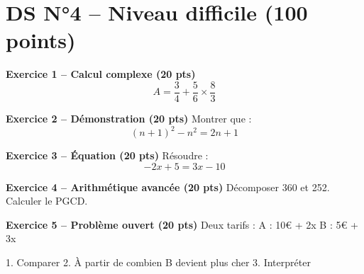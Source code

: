 \documentclass[11pt,a4paper]{article}
\begin{document}
\newpage
\section*{DS N°4 – Niveau difficile (100 points)}

\textbf{Exercice 1 – Calcul complexe (20 pts)}  
\[
A = \frac{3}{4} + \frac{5}{6} \times \frac{8}{3}
\]

\bigskip

\textbf{Exercice 2 – Démonstration (20 pts)}  
Montrer que :
\[
(n+1)^2 - n^2 = 2n+1
\]

\bigskip

\textbf{Exercice 3 – Équation (20 pts)}  
Résoudre :
\[
-2x + 5 = 3x - 10
\]

\bigskip

\textbf{Exercice 4 – Arithmétique avancée (20 pts)}  
Décomposer 360 et 252.  
Calculer le PGCD.

\bigskip

\textbf{Exercice 5 – Problème ouvert (20 pts)}  
Deux tarifs :  
A : 10€ + 2x  
B : 5€ + 3x  

1. Comparer  
2. À partir de combien B devient plus cher  
3. Interpréter  
\end{document}
